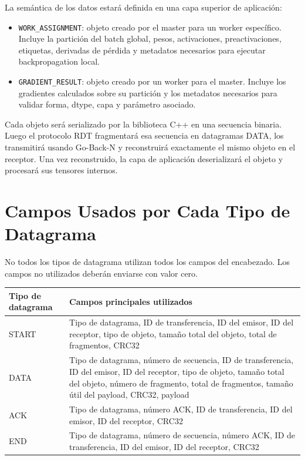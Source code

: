 \documentclass[12pt]{article}
\begin{document}
La semántica de los datos estará definida en una capa superior de aplicación:

\begin{itemize}
\item \texttt{WORK\_ASSIGNMENT}: objeto creado por el master para un worker específico. Incluye la partición del batch global, pesos, activaciones, preactivaciones, etiquetas, derivadas de pérdida y metadatos necesarios para ejecutar backpropagation local.
\item \texttt{GRADIENT\_RESULT}: objeto creado por un worker para el master. Incluye los gradientes calculados sobre su partición y los metadatos necesarios para validar forma, dtype, capa y parámetro asociado.
\end{itemize}

Cada objeto será serializado por la biblioteca C++ en una secuencia binaria. Luego el protocolo RDT fragmentará esa secuencia en datagramas DATA, los transmitirá usando Go-Back-N y reconstruirá exactamente el mismo objeto en el receptor. Una vez reconstruido, la capa de aplicación deserializará el objeto y procesará sus tensores internos.

\section{Campos Usados por Cada Tipo de Datagrama}

No todos los tipos de datagrama utilizan todos los campos del encabezado. Los campos no utilizados deberán enviarse con valor cero.

\begin{longtable}{|l|p{10cm}|}
\hline
Tipo de datagrama & Campos principales utilizados \\
\hline
START & Tipo de datagrama, ID de transferencia, ID del emisor, ID del receptor, tipo de objeto, tamaño total del objeto, total de fragmentos, CRC32 \\
\hline
DATA & Tipo de datagrama, número de secuencia, ID de transferencia, ID del emisor, ID del receptor, tipo de objeto, tamaño total del objeto, número de fragmento, total de fragmentos, tamaño útil del payload, CRC32, payload \\
\hline
ACK & Tipo de datagrama, número ACK, ID de transferencia, ID del emisor, ID del receptor, CRC32 \\
\hline
END & Tipo de datagrama, número de secuencia, número ACK, ID de transferencia, ID del emisor, ID del receptor, CRC32 \\
\hline
\end{longtable}
\end{document}
